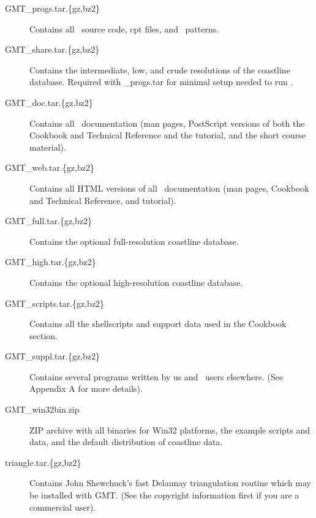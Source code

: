 \begin{description}

\item[GMT\_progs.tar.\{gz,bz2\}] Contains all \GMT\ source code,
cpt files, and \PS\ patterns.

\item [GMT\_share.tar.\{gz,bz2\}] Contains the intermediate,
low, and crude resolutions of the coastline database.  Required
with \_progs.tar for minimal setup needed to run \GMT.

\item[GMT\_doc.tar.\{gz,bz2\}] Contains all \GMT\ documentation
(man pages, PostScript versions of both the Cookbook and Technical
Reference and the tutorial, and the short course material).

\item[GMT\_web.tar.\{gz,bz2\}] Contains all HTML versions of all
\GMT\ documentation (man pages, Cookbook and Technical Reference,
and tutorial).

\item[GMT\_full.tar.\{gz,bz2\}] Contains the optional
full-resolution coastline database.

\item[GMT\_high.tar.\{gz,bz2\}] Contains the optional
high-resolution coastline database.

\item[GMT\_scripts.tar.\{gz,bz2\}] Contains all the shellscripts
and support data used in the Cookbook section.

\item[GMT\_suppl.tar.\{gz,bz2\}] Contains several programs
written by us and \GMT\ users elsewhere. (See Appendix A for more
details).

\item[GMT\_win32bin.zip] ZIP archive with all binaries for Win32
platforms, the example scripts and data, and the default distribution
of coastline data.

\item[triangle.tar.\{gz,bz2\}] Contains John Shewchuck's fast Delaunay
triangulation routine which may be installed with GMT. (See the copyright
information first if you are a commercial user).


\end{description}


